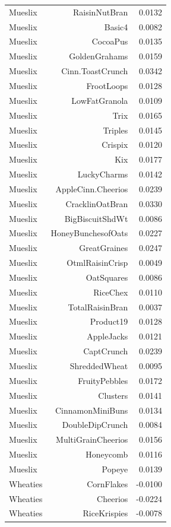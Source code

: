 \begin{longtable}{@{}lrr@{}}
Mueslix & RaisinNutBran & 0.0132 \\
Mueslix & Basic4 & 0.0082 \\
Mueslix & CocoaPus & 0.0135 \\
Mueslix & GoldenGrahams & 0.0159 \\
Mueslix & Cinn.ToastCrunch & 0.0342 \\
Mueslix & FrootLoops & 0.0128 \\
Mueslix & LowFatGranola & 0.0109 \\
Mueslix & Trix & 0.0165 \\
Mueslix & Triples & 0.0145 \\
Mueslix & Crispix & 0.0120 \\
Mueslix & Kix & 0.0177 \\
Mueslix & LuckyCharms & 0.0142 \\
Mueslix & AppleCinn.Cheerios & 0.0239 \\
Mueslix & CracklinOatBran & 0.0330 \\
Mueslix & BigBiscuitShdWt & 0.0086 \\
Mueslix & HoneyBunchesofOats & 0.0227 \\
Mueslix & GreatGraines & 0.0247 \\
Mueslix & OtmlRaisinCrisp & 0.0049 \\
Mueslix & OatSquares & 0.0086 \\
Mueslix & RiceChex & 0.0110 \\
Mueslix & TotalRaisinBran & 0.0037 \\
Mueslix & Product19 & 0.0128 \\
Mueslix & AppleJacks & 0.0121 \\
Mueslix & CaptCrunch & 0.0239 \\
Mueslix & ShreddedWheat & 0.0095 \\
Mueslix & FruityPebbles & 0.0172 \\
Mueslix & Clusters & 0.0141 \\
Mueslix & CinnamonMiniBuns & 0.0134 \\
Mueslix & DoubleDipCrunch & 0.0084 \\
Mueslix & MultiGrainCheerios & 0.0156 \\
Mueslix & Honeycomb & 0.0116 \\
Mueslix & Popeye & 0.0139 \\
Wheaties & CornFlakes & -0.0100 \\
Wheaties & Cheerios & -0.0224 \\
Wheaties & RiceKrispies & -0.0078 \\

\end{longtable}
